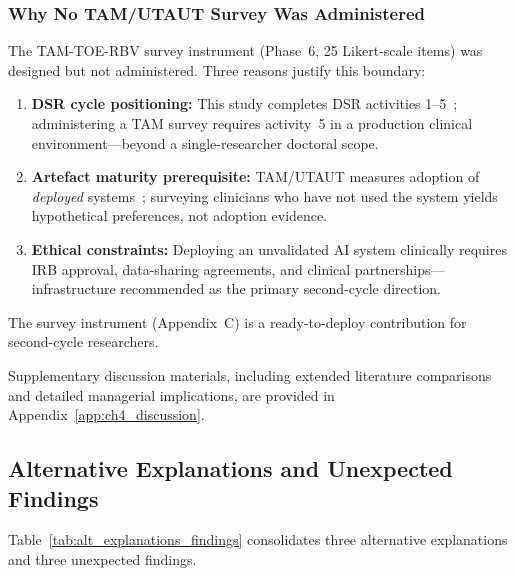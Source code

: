 \subsubsection{Why No TAM/UTAUT Survey Was Administered}

The TAM-TOE-RBV survey instrument (Phase~6, 25 Likert-scale items) was designed but not administered. Three reasons justify this boundary:

\begin{enumerate}[leftmargin=*, itemsep=2pt]
    \item \textbf{DSR cycle positioning:} This study completes DSR activities 1--5~\cite{peffers2007dsr}; administering a TAM survey requires activity~5 in a production clinical environment---beyond a single-researcher doctoral scope.
    \item \textbf{Artefact maturity prerequisite:} TAM/UTAUT measures adoption of \textit{deployed} systems~\cite{venkatesh2003utaut}; surveying clinicians who have not used the system yields hypothetical preferences, not adoption evidence.
    \item \textbf{Ethical constraints:} Deploying an unvalidated AI system clinically requires IRB approval, data-sharing agreements, and clinical partnerships---infrastructure recommended as the primary second-cycle direction.
\end{enumerate}

\noindent The survey instrument (Appendix~C) is a ready-to-deploy contribution for second-cycle researchers.


Supplementary discussion materials, including extended literature comparisons and detailed managerial implications, are provided in Appendix~\ref{app:ch4_discussion}.

\subsection{Alternative Explanations and Unexpected Findings}

Table~\ref{tab:alt_explanations_findings} consolidates three alternative explanations and three unexpected findings.

